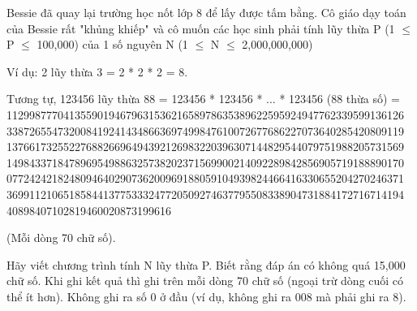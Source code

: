 Bessie đã quay lại trường học nốt lớp 8 để lấy được tấm bằng. Cô giáo dạy toán của Bessie rất "khủng khiếp" và cô muốn các học sinh phải tính lũy thừa P (1  $\le$  P  $\le$  100,000) của 1 số nguyên N (1  $\le$  N  $\le$  2,000,000,000)  

   Ví dụ: 2 lũy thừa 3 = 2 * 2 * 2 = 8.  

   Tương tự, 123456 lũy thừa 88 = 123456 * 123456 * ... * 123456 (88  thừa số) =  1129987770413559019467963153621658978635389622595924947762339599136126 3387265547320084192414348663697499847610072677686227073640285420809119 1376617325522768826696494392126983220396307144829544079751988205731569 1498433718478969549886325738202371569900214092289842856905719188890170 0772424218248094640290736200969188059104939824466416330655204270246371 3699112106518584413775333247720509274637795508338904731884172716714194 40898407102819460020873199616  

   (Mỗi dòng 70 chữ số).  

   Hãy viết chương trình tính N lũy thừa P. Biết rằng đáp án có không quá 15,000 chữ số. Khi ghi kết quả thì ghi trên mỗi dòng 70 chữ số (ngoại trừ dòng cuối có thể ít hơn). Không ghi ra số 0 ở đầu (ví dụ, không ghi ra  008 mà phải ghi ra 8).